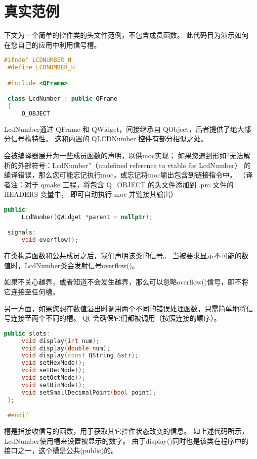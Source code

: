 \section{真实范例}

下文为一个简单的控件类的头文件范例，不包含成员函数。
此代码目为演示如何在您自己的应用中利用信号槽。

\begin{lstlisting}[language=C++]
 #ifndef LCDNUMBER_H
 #define LCDNUMBER_H

 #include <QFrame>

 class LcdNumber : public QFrame
 {
     Q_OBJECT
\end{lstlisting}

LcdNumber通过 QFrame 和 QWidget，间接继承自 QObject，后者提供了绝大部分信号槽特性。
这和内置的 QLCDNumber 控件有部分相似之处。

会被编译器展开为一些成员函数的声明，以供moc实现；
如果您遇到形如“无法解析的外部符号：LcdNumber”（undefined reference to vtable for LcdNumber）
的编译错误，那么您可能忘记执行moc，或忘记将moc输出包含到链接指令中。
（译者注：对于 qmake 工程，将包含 Q\_OBJECT 的头文件添加到 .pro 文件的 HEADERS 变量中，
即可自动执行 moc 并链接其输出）

\begin{lstlisting}[language=C++]
 public:
     LcdNumber(QWidget *parent = nullptr);

 signals:
     void overflow();
\end{lstlisting}

在类构造函数和公共成员之后，我们声明该类的信号。
当被要求显示不可能的数值时，LcdNumber类会发射信号overflow()。

如果不关心越界，或者知道不会发生越界，那么可以忽略overflow()信号，即不将它连接至任何槽。

另一方面，如果您想在数值溢出时调用两个不同的错误处理函数，只需简单地将信号连接至两个不同的槽。
Qt 会确保它们都被调用（按照连接的顺序）。

\begin{lstlisting}[language=C++]
 public slots:
     void display(int num);
     void display(double num);
     void display(const QString &str);
     void setHexMode();
     void setDecMode();
     void setOctMode();
     void setBinMode();
     void setSmallDecimalPoint(bool point);
 };

 #endif
\end{lstlisting}


槽是指接收信号的函数，用于获取其它控件状态改变的信息。
如上述代码所示，LcdNumber使用槽来设置被显示的数字。
由于display()同时也是该类在程序中的接口之一，这个槽是公共(public)的。

